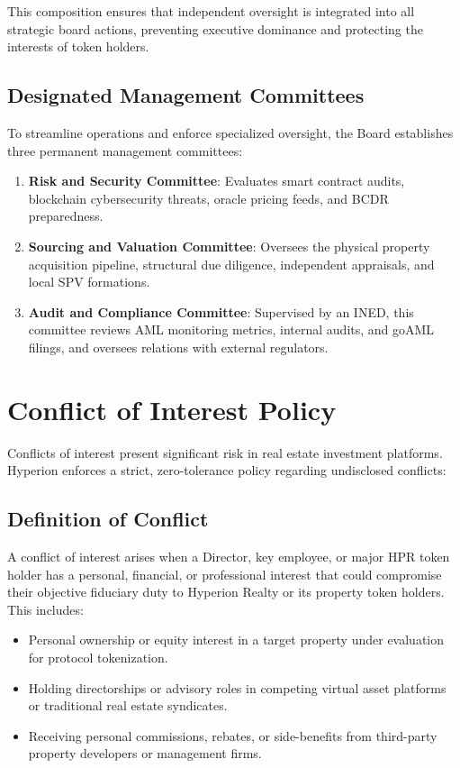 \documentclass[11pt]{article}
\begin{document}
This composition ensures that independent oversight is integrated into all strategic board actions, preventing executive dominance and protecting the interests of token holders.

\subsection{Designated Management Committees}
To streamline operations and enforce specialized oversight, the Board establishes three permanent management committees:
\begin{enumerate}
    \item \textbf{Risk and Security Committee}: Evaluates smart contract audits, blockchain cybersecurity threats, oracle pricing feeds, and BCDR preparedness.
    \item \textbf{Sourcing and Valuation Committee}: Oversees the physical property acquisition pipeline, structural due diligence, independent appraisals, and local SPV formations.
    \item \textbf{Audit and Compliance Committee}: Supervised by an INED, this committee reviews AML monitoring metrics, internal audits, and goAML filings, and oversees relations with external regulators.
\end{enumerate}

\section{Conflict of Interest Policy}
Conflicts of interest present significant risk in real estate investment platforms. Hyperion enforces a strict, zero-tolerance policy regarding undisclosed conflicts:

\subsection{Definition of Conflict}
A conflict of interest arises when a Director, key employee, or major HPR token holder has a personal, financial, or professional interest that could compromise their objective fiduciary duty to Hyperion Realty or its property token holders. This includes:
\begin{itemize}
    \item Personal ownership or equity interest in a target property under evaluation for protocol tokenization.
    \item Holding directorships or advisory roles in competing virtual asset platforms or traditional real estate syndicates.
    \item Receiving personal commissions, rebates, or side-benefits from third-party property developers or management firms.
\end{itemize}
\end{document}
